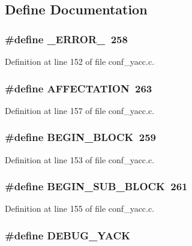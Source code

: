 \subsection{Define Documentation}
\subsubsection[{\_\-ERROR\_\-}]{\setlength{\rightskip}{0pt plus 5cm}\#define \_\-ERROR\_\-~258}\label{conf__yacc_8c_a4d178ec5f52534c3fcc7b775e0d45dca}


Definition at line 152 of file conf\_\-yacc.c.
\subsubsection[{AFFECTATION}]{\setlength{\rightskip}{0pt plus 5cm}\#define AFFECTATION~263}\label{conf__yacc_8c_a022df7a30fcaef01eebfb88950340e5f}


Definition at line 157 of file conf\_\-yacc.c.
\subsubsection[{BEGIN\_\-BLOCK}]{\setlength{\rightskip}{0pt plus 5cm}\#define BEGIN\_\-BLOCK~259}\label{conf__yacc_8c_a0cfed3166e84c638e5e9fa1699a80ef9}


Definition at line 153 of file conf\_\-yacc.c.
\subsubsection[{BEGIN\_\-SUB\_\-BLOCK}]{\setlength{\rightskip}{0pt plus 5cm}\#define BEGIN\_\-SUB\_\-BLOCK~261}\label{conf__yacc_8c_a58b355915dd539386d8e0b3b7a01ecf5}


Definition at line 155 of file conf\_\-yacc.c.
\subsubsection[{DEBUG\_\-YACK}]{\setlength{\rightskip}{0pt plus 5cm}\#define DEBUG\_\-YACK}\label{conf__yacc_8c_a2c1ac69cdb2da00dbefd1fe0e971e08c}



